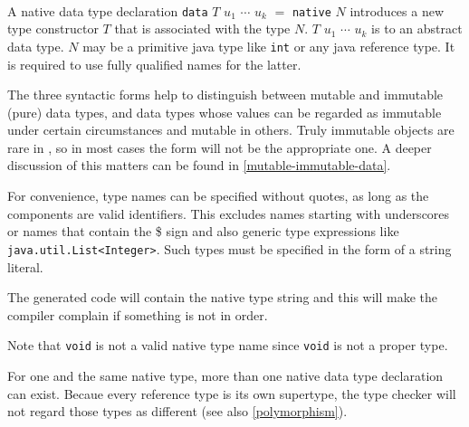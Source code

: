 \begin{flushleft}
    \sym{=}   
\alt {}   \sym{=}   
\alt {}   \sym{=}   \\
 
  \alt {}
  \alt {}  
  \alt {}  
\end{flushleft}

A native data type declaration \texttt{data} $T$ $u_1$ $\cdots$ $u_k$ $=$ \texttt{native} $N$ introduces a new type constructor $T$ that is associated with the \java{} type $N$. $T$  $u_1$ $\cdots$ $u_k$ is to \frege{} an abstract data type. $N$ may be a primitive java type like \texttt{int} or any java reference type. It is required to use fully qualified \java{} names for the latter.

The three syntactic forms help to distinguish between mutable and immutable (pure) data types, 
and data types whose values can be regarded as immutable under certain circumstances and mutable in others. 
Truly immutable objects are rare in \java{}, so in most cases the  form will not be the appropriate one. A deeper discussion of this matters can be found in \autoref{mutable-immutable-data}.

For convenience, \java{} type names can be specified without quotes, as long as the components are valid \frege{} identifiers. This excludes names starting with underscores or names that contain the \$ sign and also \java{} generic type expressions like \texttt{java.util.List<Integer>}. Such \java{} types must be specified in the form of a string literal.

The generated code will contain the native type string and this will make the \java{} compiler complain if something is not in order.

Note that \texttt{void} is not a valid native type name since \texttt{void} is not a proper type.

For one and the same native type, more than one native data type declaration can exist. Becaue every reference type is its own supertype, the type checker will not regard those types as different (see also \autoref{polymorphism}).

